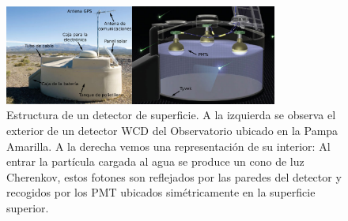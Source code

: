 \begin{figure}[!ht]
  \centering
\includegraphics[width=0.8\textwidth]{Figs/SD_componentes.png}
  \caption{Estructura de un detector de superficie. A la izquierda se observa el exterior de un detector WCD del Observatorio ubicado en la Pampa Amarilla. A la derecha vemos una representación de su interior: Al entrar la partícula cargada al agua se produce un cono de luz Cherenkov, estos fotones son reflejados por las paredes del detector y recogidos por los PMT ubicados simétricamente en la superficie superior. \cite{allekotte_2008}}
  \label{fig:SD_auger}
\end{figure}



